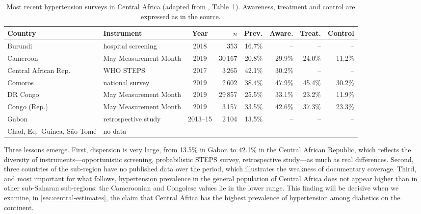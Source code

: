 \documentclass[12pt,a4paper,oneside]{report}
\begin{document}
\begin{table}[htbp]
\centering\footnotesize
\caption{Most recent hypertension surveys in Central Africa (adapted from \cite{gafane2025}, Table~1). Awareness, treatment and control are expressed as in the source.}\label{tab:central-africa}
\begin{tabularx}{\textwidth}{@{}l >{\raggedright\arraybackslash}X c r r r r r@{}}
\toprule
\textbf{Country} & \textbf{Instrument} & \textbf{Year} & \textbf{$n$} & \textbf{Prev.} & \textbf{Aware.} & \textbf{Treat.} & \textbf{Control} \\
\midrule
Burundi & hospital screening & 2018 & 353 & 16.7\% & -- & -- & -- \\
Cameroon & May Measurement Month & 2019 & 30\,167 & 20.8\% & 29.9\% & 24.0\% & 11.2\% \\
Central African Rep. & WHO STEPS & 2017 & 3\,265 & 42.1\% & 30.2\% & -- & -- \\
Comoros & national survey & 2019 & 2\,602 & 38.4\% & 47.9\% & 45.4\% & 30.2\% \\
DR Congo & May Measurement Month & 2019 & 29\,857 & 25.5\% & 33.1\% & 23.2\% & 11.9\% \\
Congo (Rep.) & May Measurement Month & 2019 & 3\,157 & 33.5\% & 42.6\% & 37.3\% & 23.3\% \\
Gabon & retrospective study & 2013--15 & 2\,104 & 13.5\% & -- & -- & -- \\
Chad, Eq.\ Guinea, S\~ao Tom\'e & no data & -- & -- & -- & -- & -- & -- \\
\bottomrule
\end{tabularx}
\end{table}

Three lessons emerge. First, dispersion is very large, from 13.5\% in Gabon to 42.1\% in the Central African Republic, which reflects the diversity of instruments---opportunistic screening, probabilistic STEPS survey, retrospective study---as much as real differences. Second, three countries of the sub-region have no published data over the period, which illustrates the weakness of documentary coverage. Third, and most important for what follows, hypertension prevalence in the general population of Central Africa does not appear higher than in other sub-Saharan sub-regions: the Cameroonian and Congolese values lie in the lower range. This finding will be decisive when we examine, in \cref{sec:central-estimates}, the claim that Central Africa has the highest prevalence of hypertension among diabetics on the continent.
\end{document}

